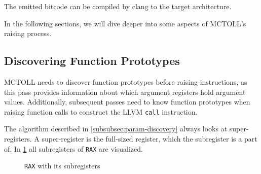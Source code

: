 The emitted bitcode can be compiled by clang to the target architecture.

In the following sections, we will dive deeper into some aspects of MCTOLL's raising process.

\subsection{Discovering Function Prototypes}\label{subsec:discovering-function-prototypes}

MCTOLL needs to discover function prototypes before raising instructions, as this pass provides information about which argument registers hold argument values.
Additionally, subsequent passes need to know function prototypes when raising function calls to construct the LLVM \texttt{call} instruction.

The algorithm described in \cref{subsubsec:param-discovery} always looks at super-registers.
A super-register is the full-sized register, which the subregister is a part of.
In \cref{fig:x86-64-rax-subregs} all subregisters of \texttt{RAX} are visualized.

\begin{figure}[htpb]
    \centering
    \caption{\texttt{RAX} with its subregisters}
    \label{fig:x86-64-rax-subregs}
\end{figure}


